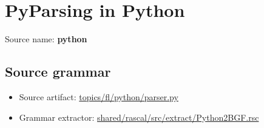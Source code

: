 \chapter{PyParsing in Python}

 Source name: \textbf{python}

\section{Source grammar}

\begin{itemize}\item Source artifact: \href{http://github.com/grammarware/slps/blob/master/topics/fl/python/parser.py}{topics/fl/python/parser.py}\item Grammar extractor: \href{http://github.com/grammarware/slps/blob/master/shared/rascal/src/extract/Python2BGF.rsc}{shared/rascal/src/extract/Python2BGF.rsc}\end{itemize}


